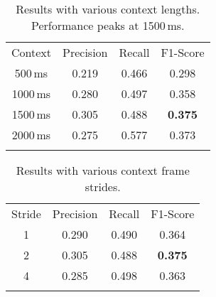 \begin{table}
    \centering
    \begin{tabular}{cccc}
    \hline\noalign{\smallskip}
    Context & Precision & Recall & F1-Score \\
    \noalign{\smallskip}\svhline\noalign{\smallskip}
    500\,ms & 0.219 & 0.466 & 0.298 \\
    1000\,ms & 0.280 & 0.497 & 0.358 \\
    1500\,ms & 0.305 & 0.488 & \bf{0.375} \\
    2000\,ms & 0.275 & 0.577 & 0.373 \\
    \noalign{\smallskip}\hline\noalign{\smallskip}
    \end{tabular}
    \caption{Results with various context lengths. Performance peaks at 1500\,ms.}\label{tbl:varycontext}
\end{table}

\begin{table}
    \centering
    \begin{tabular}{cccc}
    \hline\noalign{\smallskip}
    Stride & Precision & Recall & F1-Score \\
    \noalign{\smallskip}\svhline\noalign{\smallskip}
    1 & 0.290 & 0.490 & 0.364 \\
    2 & 0.305 & 0.488 & \bf{0.375} \\
    4 & 0.285 & 0.498 & 0.363 \\
    \noalign{\smallskip}\hline\noalign{\smallskip}
    \end{tabular}
    \caption{Results with various context frame strides.}\label{tbl:varystrides}
\end{table}

